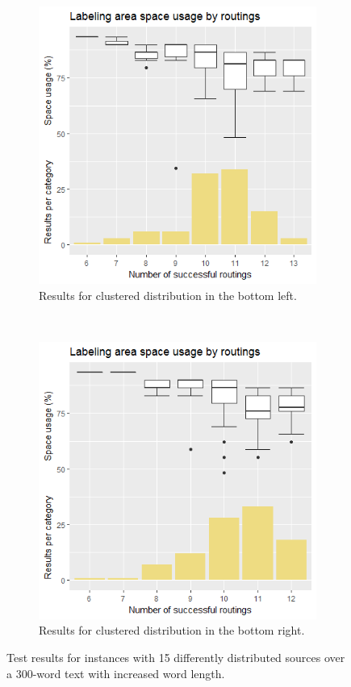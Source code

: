 \documentclass[11pt,a4paper]{vutinfth}
\begin{document}
\begin{figure}
	\begin{subfigure}[b]{/11}
		\centering
		\includegraphics[scale=0.55]{Rplot_15bl_longer.png}
		\caption{\label{fig:15blLong}Results for clustered distribution in the bottom left.}
	\end{subfigure}~~%
	\begin{subfigure}[b]{/11}
		\centering
		\includegraphics[scale=0.55]{Rplot_15br_longer.png}
		\caption{\label{fig:15brLong}Results for clustered distribution in the bottom right.}
	\end{subfigure}
	\caption{Test results for instances with 15 differently distributed sources over a 300-word text with increased word length.}
	\label{fig:longTests}
\end{figure}
\end{document}
